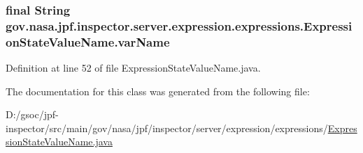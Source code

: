 \subsubsection[{\texorpdfstring{var\+Name}{varName}}]{\setlength{\rightskip}{0pt plus 5cm}final String gov.\+nasa.\+jpf.\+inspector.\+server.\+expression.\+expressions.\+Expression\+State\+Value\+Name.\+var\+Name\hspace{0.3cm}{\ttfamily [private]}}\hypertarget{classgov_1_1nasa_1_1jpf_1_1inspector_1_1server_1_1expression_1_1expressions_1_1_expression_state_value_name_a5861f8633f2b17e241b6c108a5671be3}{}\label{classgov_1_1nasa_1_1jpf_1_1inspector_1_1server_1_1expression_1_1expressions_1_1_expression_state_value_name_a5861f8633f2b17e241b6c108a5671be3}


Definition at line 52 of file Expression\+State\+Value\+Name.\+java.



The documentation for this class was generated from the following file\+:\begin{DoxyCompactItemize}
\item 
D\+:/gsoc/jpf-\/inspector/src/main/gov/nasa/jpf/inspector/server/expression/expressions/\hyperlink{_expression_state_value_name_8java}{Expression\+State\+Value\+Name.\+java}\end{DoxyCompactItemize}
